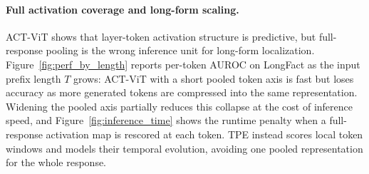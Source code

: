 \paragraph{Full activation coverage and long-form scaling.}\label{app:full_activation_coverage}
ACT-ViT shows that layer-token activation structure is predictive, but
full-response pooling is the wrong inference unit for long-form
localization. Figure~\ref{fig:perf_by_length} reports per-token AUROC
on LongFact as the input prefix length $T$ grows: ACT-ViT with a short
pooled token axis is fast but loses accuracy as more generated tokens
are compressed into the same representation. Widening the pooled axis
partially reduces this collapse at the cost of inference speed, and
Figure~\ref{fig:inference_time} shows the runtime penalty when a
full-response activation map is rescored at each token. TPE instead
scores local token windows and models their temporal evolution,
avoiding one pooled representation for the whole response.












